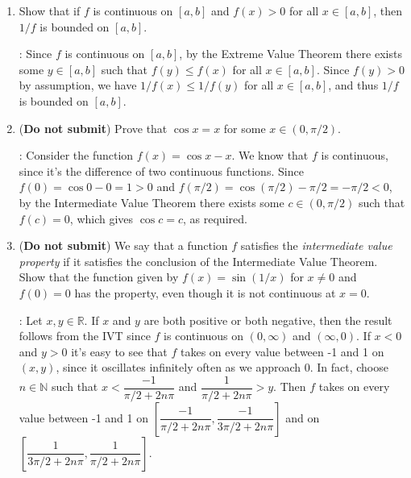 \documentclass[letterpaper,12pt]{article}
\newcommand{\R}{\mathbb{R}}
\newcommand{\N}{\mathbb{N}}
\begin{document}
\begin{enumerate}
\bigskip

 \item Show that if $f$ is continuous on $[a,b]$ and $f(x)>0$ for all $x\in [a,b]$, then $1/f$ is bounded on $[a,b]$.

\bigskip

: Since $f$ is continuous on $[a,b]$, by the Extreme Value Theorem there exists some $y\in [a,b]$ such that $f(y)\leq f(x)$ for all $x\in [a,b]$. Since $f(y)>0$ by assumption, we have $1/f(x)\leq 1/f(y)$ for all $x\in [a,b]$, and thus $1/f$ is bounded on $[a,b]$.

\bigskip

 \item ({\bf Do not submit}) Prove that $\cos x = x$ for some $x\in (0,\pi/2)$.

\bigskip

: Consider the function $f(x) = \cos x - x$. We know that $f$ is continuous, since it's the difference of two continuous functions. Since $f(0) = \cos 0 -0 =1>0$ and $f(\pi/2) = \cos (\pi/2)-\pi/2 = -\pi/2 < 0$, by the Intermediate Value Theorem there exists some $c\in (0,\pi/2)$ such that $f(c)=0$, which gives $\cos c = c$, as required.

\bigskip

 \item ({\bf Do not submit}) We say that a function $f$ satisfies the {\em intermediate value property} if it satisfies the conclusion of the Intermediate Value Theorem. Show that the function given by $f(x)=\sin (1/x)$ for $x\neq 0$ and $f(0)=0$ has the property, even though it is not continuous at $x=0$.

\bigskip

: Let $x,y\in\R$. If $x$ and $y$ are both positive or both negative, then the result follows from the IVT since $f$ is continuous on $(0,\infty)$ and $(\infty,0)$. If $x<0$ and $y>0$ it's easy to see that $f$ takes on every value between -1 and 1 on $(x,y)$, since it oscillates infinitely often as we approach 0. In fact, choose $n\in\N$ such that $x<\dfrac{-1}{\pi/2+2n\pi}$ and $\dfrac{1}{\pi/2+2n\pi}>y$. Then $f$ takes on every value between -1 and 1 on $\left[\dfrac{-1}{\pi/2+2n\pi},\dfrac{-1}{3\pi/2+2n\pi}\right]$ and on $\left[\dfrac{1}{3\pi/2+2n\pi},\dfrac{1}{\pi/2+2n\pi}\right]$.

\bigskip


\end{enumerate}
\end{document}

